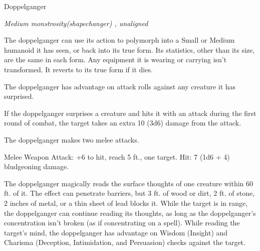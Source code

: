 \begin{monsterbox}{Doppelganger}
\begin{hangingpar}
\textit{Medium monstrosity(shapechanger) , unaligned}
\end{hangingpar}
\dndline%
\basics[%
armorclass = 14,
hitpoints = 8d8 + 16,
speed = {30 ft.}
]
\dndline%
\stats[%
STR = \stat{11},
DEX = \stat{18},
CON = \stat{14},
INT = \stat{11},
WIS = \stat{12},
CHA = \stat{14}
]
\dndline%
\details[%
skills={Insight +3, Deception +6, },
damageimmunities={charmed},
savingthrows={},
conditionimmunities={},
damageresistances={},
damagevulnerabilities={},
senses={darkvision 60 ft., passive Perception 11},
languages={Common},
challenge=3
]
\dndline%
\begin{monsteraction}[Shapechanger]
The doppelganger can use its action to polymorph into a Small or Medium humanoid it has seen, or back into its true form. Its statistics, other than its size, are the same in each form. Any equipment it is wearing or carrying isn't transformed. It reverts to its true form if it dies.
\end{monsteraction}
\begin{monsteraction}[Ambusher]
The doppelganger has advantage on attack rolls against any creature it has surprised.
\end{monsteraction}
\begin{monsteraction}
If the doppelganger surprises a creature and hits it with an attack during the first round of combat, the target takes an extra 10 (3d6) damage from the attack.
\end{monsteraction}
\begin{monsteraction}[Multiattack]
The doppelganger makes two melee attacks.
\end{monsteraction}
\begin{monsteraction}[Slam]
Melee Weapon Attack: +6 to hit, reach 5 ft., one target. Hit: 7 (1d6 + 4) bludgeoning damage.
\end{monsteraction}
\begin{monsteraction}
The doppelganger magically reads the surface thoughts of one creature within 60 ft. of it. The effect can penetrate barriers, but 3 ft. of wood or dirt, 2 ft. of stone, 2 inches of metal, or a thin sheet of lead blocks it. While the target is in range, the doppelganger can continue reading its thoughts, as long as the doppelganger's concentration isn't broken (as if concentrating on a spell). While reading the target's mind, the doppelganger has advantage on Wisdom (Insight) and Charisma (Deception, Intimidation, and Persuasion) checks against the target.
\end{monsteraction}
\end{monsterbox}